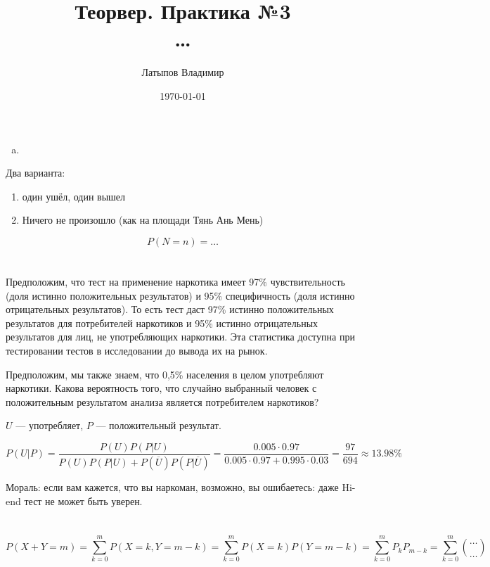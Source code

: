\documentclass[12pt, a4paper]{article}
\title{Теорвер. Практика №3 \\ \large …}
\author{
  Латыпов Владимир
}
\date{\today}
\begin{document}
\maketitle


\section{}

\begin{enumerate}[(a)]
    \item 
\end{enumerate}

Два варианта: 

\begin{enumerate}
    \item один ушёл, один вышел
    \item Ничего не произошло (как на площади Тянь Ань Мень)
\end{enumerate}

\begin{equation}
    P(N = n) = …
\end{equation}

\section{}

Предположим, что тест на применение наркотика имеет 97\% чувствительность
(доля истинно положительных результатов)
и 95\% специфичность (доля истинно отрицательных результатов). То есть тест даст 97\% истинно положительных результатов для потребителей наркотиков и 
95\% истинно отрицательных результатов для лиц, не употребляющих наркотики.
Эта статистика доступна при тестировании тестов в исследовании до вывода их на рынок. 

Предположим, мы также знаем, что 0,5\% населения в целом употребляют наркотики.
Какова вероятность того, что случайно выбранный человек с положительным результатом
анализа является потребителем наркотиков?

$U$ — употребляет, $P$ — положительный результат.

\begin{equation}
    P(U | P) = \frac{P(U) P(P | U)}{P(U)P(P | U) + P(\overline{U})P(P | \overline{U})} 
    = \frac{0.005 \cdot 0.97}{0.005 \cdot 0.97 + 0.995 \cdot 0.03} = \frac{97}{694} ≈ 13.98\%
\end{equation}

Мораль: если вам кажется, что вы наркоман, возможно, вы ошибаетесь:
даже Hi-end тест не может быть уверен.



\section{}

\begin{equation}
    P(X + Y = m) = \sum_{k = 0}^{m} P(X = k, Y = m - k) = \sum_{k = 0}^{m} P(X = k) P(Y = m - k) = \sum_{k = 0}^{m} P_{k} P_{m - k} = 
    \sum_{k = 0}^{m} \binom{…}{…}
\end{equation}
\end{document}
